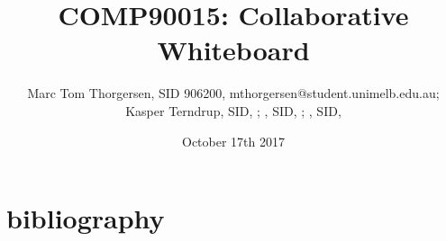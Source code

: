 \documentclass[11pt,a4paper,article,oneside]{memoir}
\title{COMP90015: Collaborative Whiteboard}
\author{Marc Tom Thorgersen, SID 906200, mthorgersen@student.unimelb.edu.au; 
        Kasper Terndrup, SID, ;
        , SID, ;
        , SID, 
        }
\date{October 17th 2017}
\begin{document}
\maketitle


\newpage


\part{bibliography}
\printbibliography
\end{document}
